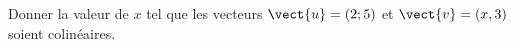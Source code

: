 
\begin{exercice}\label{exosmath-0061}

    Donner la valeur de \( x\) tel que les vecteurs \( \vect{ u }=(2;5)\) et \( \vect{ v }=(x,3)\) soient colinéaires.

\end{exercice}
